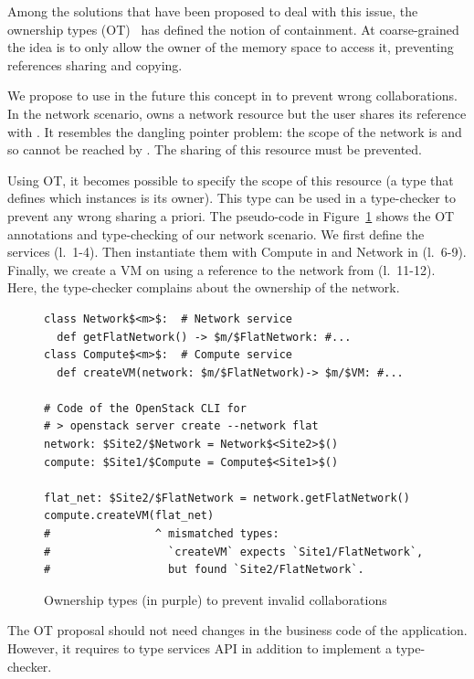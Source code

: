 %
Among the solutions that have been proposed to deal with this issue,
the ownership types (\acrshort{OT})~\cite{CPN98,BLS03} has defined the
notion of containment.
%
At coarse-grained the idea is to only allow the owner of the memory
space to access it, preventing references sharing and copying.

We propose to use in the future this concept in \scl to prevent wrong
collaborations.
%
In the network scenario, \sTwo owns a network resource but the user
shares its reference with \sOne.
%
It resembles the dangling pointer problem: the scope of the network
is \sTwo and so cannot be reached by \sOne.
%
The sharing of this resource must be prevented.

Using \acrshort{OT}, it becomes possible to specify the scope of this
resource (\ie a type that defines which \os instances is its owner).
%
This type can be used in a type-checker to prevent any wrong sharing a
priori.
%
The pseudo-code in Figure~\ref{lst:OT} shows the OT annotations
and type-checking of our network scenario.
%
We first define the services (l.~1-4). Then instantiate them with
Compute in \sOne and Network in \sTwo (l.~6-9).
%
Finally, we create a VM on \sOne using a reference to the network from
\sTwo (l.~11-12).
%
Here, the type-checker complains about the ownership of the network.

\begin{figure}[tb]
  \begin{lstlisting}
class Network$<m>$:  # Network service
  def getFlatNetwork() -> $m/$FlatNetwork: #...
class Compute$<m>$:  # Compute service
  def createVM(network: $m/$FlatNetwork)-> $m/$VM: #...

# Code of the OpenStack CLI for
# > openstack server create --network flat
network: $Site2/$Network = Network$<Site2>$()
compute: $Site1/$Compute = Compute$<Site1>$()

flat_net: $Site2/$FlatNetwork = network.getFlatNetwork()
compute.createVM(flat_net)
#                ^ mismatched types:
#                  `createVM` expects `Site1/FlatNetwork`,
#                  but found `Site2/FlatNetwork`.
  \end{lstlisting}
  \caption{Ownership types {\color{Purple}(in purple)} to prevent invalid collaborations}
  \label{lst:OT}
\end{figure}

The \acrshort{OT} proposal should not need changes in the business
code of the application.
%
However, it requires to type services API in addition to implement a
type-checker.


